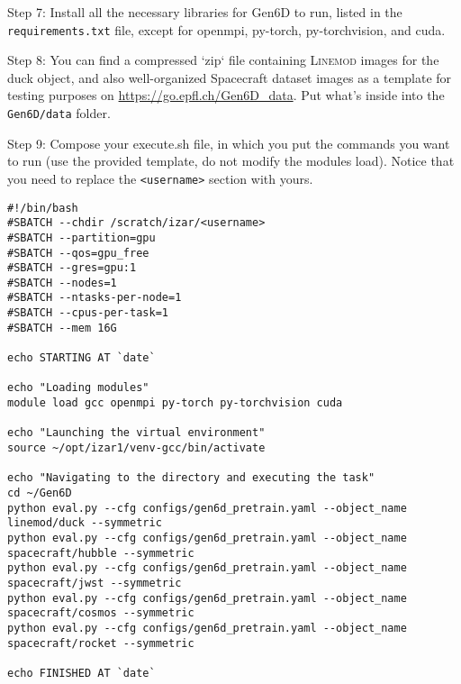 \bigskip


\noindent Step 7: Install all the necessary libraries for Gen6D to run, listed in the \\\texttt{requirements.txt} file, except for openmpi, py-torch, py-torchvision, and cuda.

\bigskip


\noindent Step 8: You can find a compressed `zip` file containing \textsc{Linemod} images for the duck object, and also well-organized Spacecraft dataset images as a template for testing purposes on \url{https://go.epfl.ch/Gen6D_data}. Put what's inside into the \texttt{Gen6D/data} folder.

\bigskip


\noindent Step 9: Compose your execute.sh file, in which you put the commands you want to run (use the provided template, do not modify the modules load). Notice that you need to replace the \texttt{<username>} section with yours.

\bigskip

\begin{lstlisting}[style=bashstyle, caption={Bash script \texttt{execute.sh} to run a machine learning model on Scitas Izar EPFL. While the overall structure remains consistent, this script is specific to Gen6D's architecture.}]
#!/bin/bash
#SBATCH --chdir /scratch/izar/<username>
#SBATCH --partition=gpu
#SBATCH --qos=gpu_free
#SBATCH --gres=gpu:1
#SBATCH --nodes=1
#SBATCH --ntasks-per-node=1
#SBATCH --cpus-per-task=1
#SBATCH --mem 16G

echo STARTING AT `date`

echo "Loading modules"
module load gcc openmpi py-torch py-torchvision cuda

echo "Launching the virtual environment"
source ~/opt/izar1/venv-gcc/bin/activate

echo "Navigating to the directory and executing the task"
cd ~/Gen6D
python eval.py --cfg configs/gen6d_pretrain.yaml --object_name linemod/duck --symmetric                                    
python eval.py --cfg configs/gen6d_pretrain.yaml --object_name spacecraft/hubble --symmetric
python eval.py --cfg configs/gen6d_pretrain.yaml --object_name spacecraft/jwst --symmetric
python eval.py --cfg configs/gen6d_pretrain.yaml --object_name spacecraft/cosmos --symmetric
python eval.py --cfg configs/gen6d_pretrain.yaml --object_name spacecraft/rocket --symmetric

echo FINISHED AT `date`
\end{lstlisting}

